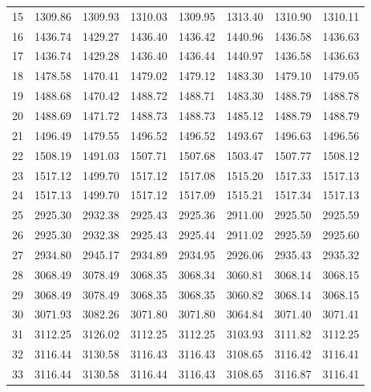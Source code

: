 \documentclass[10pt,oneside]{article}
\begin{document}
\begin{table}[h!]
\begin{tabular}{cccccccc}
15 &   1309.86 & 1309.93 & 1310.03 &    1309.95 &      1313.40 & 1310.90 &   1310.11 \\
16 &   1436.74 & 1429.27 & 1436.40 &    1436.42 &      1440.96 & 1436.58 &   1436.63 \\
17 &   1436.74 & 1429.28 & 1436.40 &    1436.44 &      1440.97 & 1436.58 &   1436.63 \\
18 &   1478.58 & 1470.41 & 1479.02 &    1479.12 &      1483.30 & 1479.10 &   1479.05 \\
19 &   1488.68 & 1470.42 & 1488.72 &    1488.71 &      1483.30 & 1488.79 &   1488.78 \\
20 &   1488.69 & 1471.72 & 1488.73 &    1488.73 &      1485.12 & 1488.79 &   1488.79 \\
21 &   1496.49 & 1479.55 & 1496.52 &    1496.52 &      1493.67 & 1496.63 &   1496.56 \\
22 &   1508.19 & 1491.03 & 1507.71 &    1507.68 &      1503.47 & 1507.77 &   1508.12 \\
23 &   1517.12 & 1499.70 & 1517.12 &    1517.08 &      1515.20 & 1517.33 &   1517.13 \\
24 &   1517.13 & 1499.70 & 1517.12 &    1517.09 &      1515.21 & 1517.34 &   1517.13 \\
25 &   2925.30 & 2932.38 & 2925.43 &    2925.36 &      2911.00 & 2925.50 &   2925.59 \\
26 &   2925.30 & 2932.38 & 2925.43 &    2925.44 &      2911.02 & 2925.59 &   2925.60 \\
27 &   2934.80 & 2945.17 & 2934.89 &    2934.95 &      2926.06 & 2935.43 &   2935.32 \\
28 &   3068.49 & 3078.49 & 3068.35 &    3068.34 &      3060.81 & 3068.14 &   3068.15 \\
29 &   3068.49 & 3078.49 & 3068.35 &    3068.35 &      3060.82 & 3068.14 &   3068.15 \\
30 &   3071.93 & 3082.26 & 3071.80 &    3071.80 &      3064.84 & 3071.40 &   3071.41 \\
31 &   3112.25 & 3126.02 & 3112.25 &    3112.25 &      3103.93 & 3111.82 &   3112.25 \\
32 &   3116.44 & 3130.58 & 3116.43 &    3116.43 &      3108.65 & 3116.42 &   3116.41 \\
33 &   3116.44 & 3130.58 & 3116.44 &    3116.43 &      3108.65 & 3116.87 &   3116.41 \\
\bottomrule
\end{tabular}
\end{table}
\end{document}
